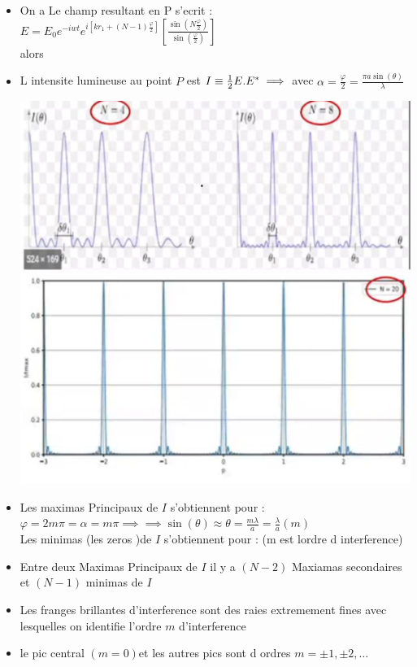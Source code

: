 \documentclass[12pt]{book}
\begin{document}
\begin{itemize}
                \item On a Le champ resultant en P s'ecrit : $E = E_0e^{-iwt}e^{i[kr_1+(N-1)\frac{\varphi}{2}]}\left[ \frac{\sin(N\frac{\varphi}{2})}{\sin(\frac{\varphi}{2})} \right]$ \\
                    alors 
                \item L intensite lumineuse au point $P$ est $I \equiv \frac{1}{2}E.E^{*} \\ \implies $ avec $\alpha = \frac{\varphi}{2}=\frac{\pi a \sin(\theta)}{\lambda} $
                    \begin{center}
                        \includegraphics[width=0.5\linewidth]{pic/reseaudediffraction1}
                        \includegraphics[width=0.49\linewidth]{pic/reseaudediffraction2}
                    \end{center}
                \item Les maximas Principaux de $I$ s'obtiennent pour :\\
                    $\varphi = 2m\pi=\alpha=m\pi\implies $$ \implies \sin(\theta) \approx \theta =\frac{m\lambda}{a}=\frac{\lambda}{a}(m)$\\
                    Les minimas (les zeros )de $I$ s'obtiennent pour :  (m est lordre d interference)
                \item Entre deux Maximas Principaux de $I$ il y a $(N-2)$ Maxiamas secondaires et $(N-1)$ minimas de $I$
                \item Les franges brillantes d'interference sont des raies extremement fines avec lesquelles on identifie l'ordre $m$ d'interference
                \item le pic central $(m=0) $et les autres pics sont d ordres $ m = \pm 1, \pm 2 ,\ldots$

\end{itemize}
\end{document}
